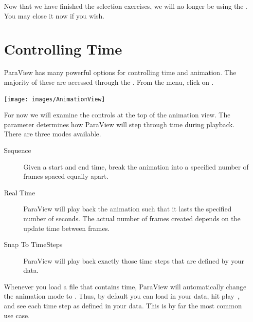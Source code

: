 Now that we have finished the selection exercises, we will no longer be
using the .  You may close it now if you wish.


\section{Controlling Time}


ParaView has many powerful options for controlling time and animation.  The
majority of these are accessed through the .  From
the menu, click on  \ra {}.

\begin{inlinefig}
  \texttt{[image: images/AnimationView]}
\end{inlinefig}

For now we will examine the controls at the top of the animation view.  The
 parameter determines how ParaView will step
through time during playback.  There are three modes available.

\begin{description}
\item[Sequence]  Given a start and end
  time, break the animation into a specified number of frames spaced
  equally apart.
\item[Real Time]  ParaView will play back
  the animation such that it lasts the specified number of seconds.  The
  actual number of frames created depends on the update time between
  frames.
\item[Snap To TimeSteps] 
  ParaView will play back exactly those time steps that are defined by your
  data.
\end{description}

Whenever you load a file that contains time, ParaView will automatically
change the animation mode to .  Thus, by default you
can load in your data, hit play~\vcrPlay, and see each time step as defined
in your data.  This is by far the most common use case.

